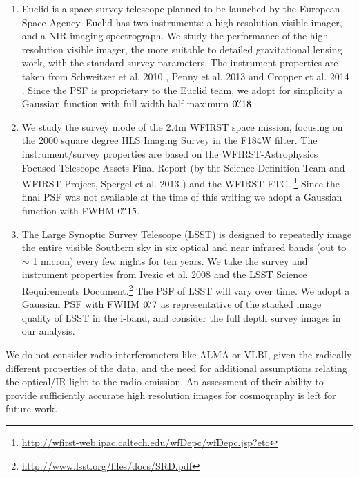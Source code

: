 \documentclass[a4paper,11pt]{article}
\begin{document}
\begin{enumerate}
\item Euclid is a space survey telescope planned to be launched by the
European Space Agency. Euclid has two instruments: a high-resolution
visible imager, and a NIR imaging spectrograph. We study the performance
of the high-resolution visible imager, the more suitable to detailed
gravitational lensing work, with the standard survey parameters.  The
instrument properties are taken from Schweitzer et al. 2010
\cite{2010SPIE.7731E..1KS}, Penny et al. 2013
\cite{2013MNRAS.434....2P} and Cropper et al. 2014
\cite{2014SPIE.9143E..0JC}. Since the PSF is proprietary to the Euclid
team, we adopt for simplicity a Gaussian function with full width half
maximum $0\hbox{$.\!\!^{\prime\prime}$}18$.

\item We study the survey mode of the 2.4m WFIRST space mission,
focusing on the 2000 square degree HLS Imaging Survey in the F184W
filter. The instrument/survey properties are based on the
WFIRST-Astrophysics Focused Telescope Assets Final Report (by the
Science Definition Team and WFIRST Project, Spergel et al. 2013
\cite{2013arXiv1305.5422S}) and the WFIRST ETC.
\footnote{\url{http://wfirst-web.ipac.caltech.edu/wfDepc/wfDepc.jsp?etc}}
Since the final PSF was not available at the time of this writing we
adopt a Gaussian function with FWHM $0\hbox{$.\!\!^{\prime\prime}$}15$.

\item The Large Synoptic Survey Telescope (LSST) is designed to
repeatedly image the entire visible Southern sky in six optical and
near infrared bands (out to $\sim$ 1 micron) every few nights for ten
years. We take the survey and instrument properties from Ivezic et
al. 2008 \cite{2008arXiv0805.2366I} and the LSST Science Requirements
Document.\footnote{\url{http://www.lsst.org/files/docs/SRD.pdf}} The
PSF of LSST will vary over time. We adopt a Gaussian PSF with FWHM
$0\hbox{$.\!\!^{\prime\prime}$}7$ as representative of the stacked image quality of LSST in
the i-band, and consider the full depth survey images in our analysis.

\end{enumerate}

We do not consider radio interferometers like ALMA or VLBI, given the
radically different properties of the data, and the need for
additional assumptions relating the optical/IR light to the radio
emission. An assessment of their ability to provide sufficiently
accurate high resolution images for cosmography is left for future
work.
\end{document}
